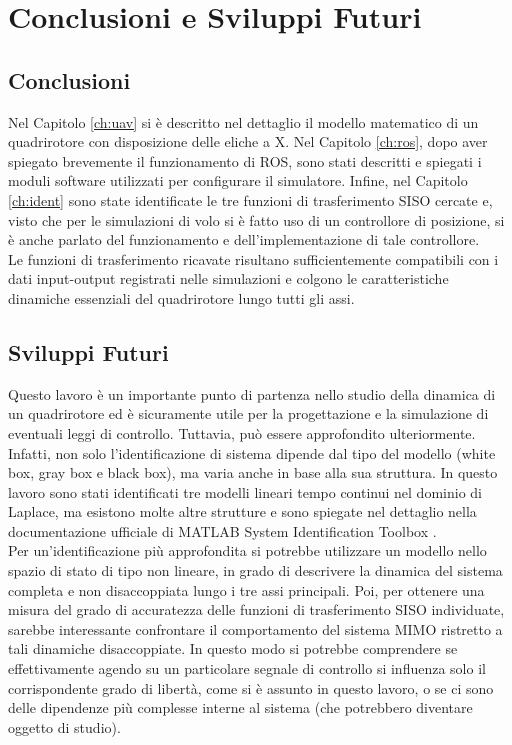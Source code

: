 
\chapter{Conclusioni e Sviluppi Futuri}\label{ch:conc}

\section{Conclusioni}
Nel Capitolo \ref{ch:uav} si è descritto nel dettaglio il modello matematico di un quadrirotore con disposizione delle eliche a X. Nel Capitolo \ref{ch:ros}, dopo aver spiegato brevemente il funzionamento di \acs{ROS}, sono stati descritti e spiegati i moduli software utilizzati per configurare il simulatore. Infine, nel Capitolo \ref{ch:ident} sono state identificate le tre funzioni di trasferimento \acs{SISO} cercate e, visto che per le simulazioni di volo si è fatto uso di un controllore di posizione, si è anche parlato del funzionamento e dell'implementazione di tale controllore.\\

Le funzioni di trasferimento ricavate risultano sufficientemente compatibili con i dati input-output registrati nelle simulazioni e colgono le caratteristiche dinamiche essenziali del quadrirotore lungo tutti gli assi.

\section{Sviluppi Futuri}
Questo lavoro è un importante punto di partenza nello studio della dinamica di un quadrirotore ed è sicuramente utile per la progettazione e la simulazione di eventuali leggi di controllo. Tuttavia, può essere approfondito ulteriormente.\\

Infatti, non solo l'identificazione di sistema dipende dal tipo del modello (white box, gray box e black box), ma varia anche in base alla sua struttura. In questo lavoro sono stati identificati tre modelli lineari tempo continui nel dominio di Laplace, ma esistono molte altre strutture e sono spiegate nel dettaglio nella documentazione ufficiale di MATLAB System Identification Toolbox \cite{sysIdMatArt} \cite{sysID}.\\

Per un'identificazione più approfondita si potrebbe utilizzare un modello nello spazio di stato di tipo non lineare, in grado di descrivere la dinamica del sistema completa e non disaccoppiata lungo i tre assi principali. Poi, per ottenere una misura del grado di accuratezza delle funzioni di trasferimento \acs{SISO} individuate, sarebbe interessante confrontare il comportamento del sistema \acs{MIMO} ristretto a tali dinamiche disaccoppiate. In questo modo si potrebbe comprendere se effettivamente agendo su un particolare segnale di controllo si influenza solo il corrispondente grado di libertà, come si è assunto in questo lavoro, o se ci sono delle dipendenze più complesse interne al sistema (che potrebbero diventare oggetto di studio).\\

